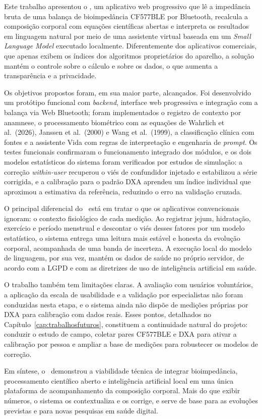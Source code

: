 Este trabalho apresentou o \sintonia, um aplicativo web progressivo que lê a impedância
bruta de uma balança de bioimpedância CF577BLE por Bluetooth, recalcula a composição
corporal com equações científicas abertas e interpreta os resultados em linguagem natural
por meio de uma assistente virtual baseada em um \emph{Small Language Model} executado
localmente. Diferentemente dos aplicativos comerciais, que apenas exibem os índices dos
algoritmos proprietários do aparelho, a solução mantém o controle sobre o cálculo e sobre
os dados, o que aumenta a transparência e a privacidade.

Os objetivos propostos foram, em sua maior parte, alcançados. Foi desenvolvido um protótipo
funcional com \emph{backend}, interface web progressiva e integração com a balança via Web
Bluetooth; foram implementados o registro de contexto por anamnese, o processamento
biométrico com as equações de Wahrlich et al.\ (2026), Janssen et al.\ (2000) e Wang et al.\
(1999), a classificação clínica com fontes e a assistente Vida com regras de interpretação e
engenharia de \emph{prompt}. Os testes funcionais confirmaram o funcionamento integrado dos
módulos, e os dois modelos estatísticos do sistema foram verificados por estudos de
simulação: a correção \emph{within-user} recuperou o viés de confundidor injetado e
estabilizou a série corrigida, e a calibração para o padrão DXA aprendeu um índice individual
que aproximou a estimativa da referência, reduzindo o erro na validação cruzada.

O principal diferencial do \sintonia\ está em tratar o que os aplicativos convencionais
ignoram: o contexto fisiológico de cada medição. Ao registrar jejum, hidratação, exercício e
período menstrual e descontar o viés desses fatores por um modelo estatístico, o sistema
entrega uma leitura mais estável e honesta da evolução corporal, acompanhada de uma banda de
incerteza. A execução local do modelo de linguagem, por sua vez, mantém os dados de saúde no
próprio servidor, de acordo com a LGPD e com as diretrizes de uso de
inteligência artificial em saúde.

O trabalho também tem limitações claras. A avaliação com usuários voluntários, a aplicação da
escala de usabilidade e a validação por especialistas não foram conduzidas nesta etapa, e o
sistema ainda não dispõe de medições próprias por DXA para calibração com dados reais. Esses
pontos, detalhados no Capítulo~\ref{cap:trabalhosfuturos}, constituem a continuidade
natural do projeto: conduzir o estudo de campo, coletar pares CF577BLE e DXA para ativar a
calibração por pessoa e ampliar a base de medições para robustecer os modelos de correção.

Em síntese, o \sintonia\ demonstrou a viabilidade técnica de integrar bioimpedância,
processamento científico aberto e inteligência artificial local em uma única plataforma de
acompanhamento da composição corporal. Mais do que exibir números, o sistema os contextualiza e os corrige, e serve de base
para as evoluções previstas e para novas pesquisas em saúde digital.
